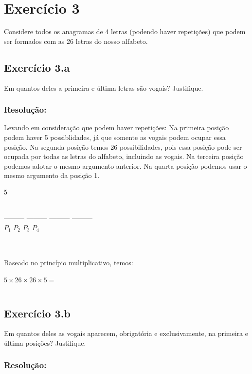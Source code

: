 \documentclass[12pt,a4paper]{article}
\newcommand\tab[1][1cm]{\hspace*{#1}}
\begin{document}
\section{Exercício 3}

Considere todos os anagramas de 4 letras (podendo haver repetições) que podem ser formados com as 26 letras do nosso alfabeto.

\subsection{Exercício 3.a}

Em quantos deles a primeira e última letras são vogais? Justifique.

\subsubsection{Resolução:}

\tab Levando em consideração que podem haver repetições: Na primeira posição podem haver 5 possiblidades, já que somente as vogais podem ocupar essa posição. Na segunda posição temos 26 possibilidades, pois essa posição pode ser ocupada por todas as letras do alfabeto, incluindo as vogais. Na terceira posição podemos adotar o mesmo argumento anterior. Na quarta posição podemos usar o mesmo argumento da posição 1.
\\
\begin{center}
5   \\\

    ---------   ---------  ---------   ---------\\
$P_{1}$ \qquad $P_{2}$ \qquad $P_{3}$ \qquad $P_{4}$\\\
\end{center}
\\
Baseado no princípio multiplicativo, temos:\\\\
$5 \times 26 \times 26 \times 5=$\\\\
\newpage

\subsection{Exercício 3.b}

Em quantos deles as vogais aparecem, obrigatória e exclusivamente, na primeira e última posições? Justifique.

\subsubsection{Resolução:}
\end{document}
